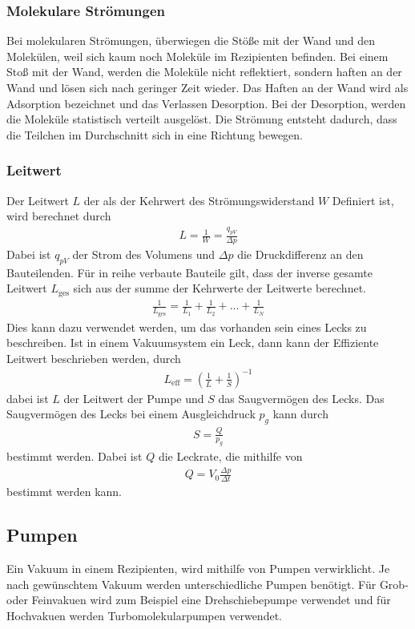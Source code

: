 \subsubsection{Molekulare Strömungen}
Bei molekularen Strömungen, überwiegen die Stöße mit der Wand und den Molekülen, weil sich kaum noch Moleküle im Rezipienten befinden. Bei einem Stoß mit der Wand, werden die Moleküle nicht reflektiert, sondern haften an der Wand und lösen sich nach geringer Zeit wieder. Das Haften an der Wand wird als Adsorption bezeichnet und das Verlassen Desorption.
Bei der Desorption, werden die Moleküle statistisch verteilt ausgelöst. Die Strömung entsteht dadurch, dass die Teilchen im Durchschnitt sich in eine Richtung bewegen.
\subsubsection{Leitwert}
Der Leitwert $L$ der als der Kehrwert des Strömungswiderstand $W$ Definiert ist, wird berechnet durch
\begin{align}
L=\frac{1}{W} = \frac{q_{pV}}{\Delta p}
\end{align}
Dabei ist $q_{pV}$ der Strom des Volumens und $\Delta p$ die Druckdifferenz an den Bauteilenden. Für in reihe verbaute Bauteile  gilt, dass der inverse gesamte Leitwert $L_\text{ges}$ sich aus der summe der Kehrwerte der Leitwerte berechnet.
 \begin{align}
 \frac{1}{L_\text{ges}}=\frac{1}{L_1}+\frac{1}{L_2}+...+\frac{1}{L_N}
 \end{align}
Dies kann dazu verwendet werden, um das vorhanden sein eines Lecks zu beschreiben. Ist in einem Vakuumsystem ein Leck, dann kann der Effiziente Leitwert beschrieben werden, durch
\begin{align}
L_\text{eff}=\left(\frac{1}{L} + \frac{1}{S}  \right)^{-1}
\label{eq:Leitwert_Reihenschaltung}
\end{align}
dabei ist $L$ der Leitwert der Pumpe und $S$ das Saugvermögen des Lecks. Das Saugvermögen des Lecks bei einem Ausgleichdruck $p_g$ kann durch 
\begin{align}
S=\frac{Q}{p_g}
\label{eq:Saugvermoegen_Leckrate}
\end{align}
bestimmt werden. Dabei ist $Q$ die Leckrate, die mithilfe von 
\begin{align}
Q = V_0 \frac{\Delta p}{\Delta t}
\label{eq:Leckrate}
\end{align}
bestimmt werden kann.
 
\subsection{Pumpen}
Ein Vakuum in einem Rezipienten, wird mithilfe von Pumpen verwirklicht. Je nach gewünschtem Vakuum werden unterschiedliche Pumpen benötigt. Für Grob- oder Feinvakuen wird zum Beispiel eine Drehschiebepumpe verwendet und für Hochvakuen werden Turbomolekularpumpen verwendet.
